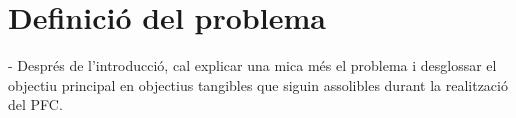 \section{Definició del problema}

        - Després de l'introducció, cal explicar una mica
        més el problema i desglossar el objectiu principal
        en objectius tangibles que siguin assolibles
        durant la realització del PFC.
